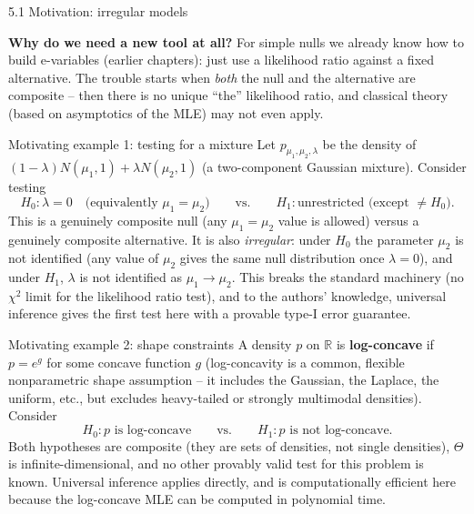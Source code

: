 \documentclass[aspectratio=169,10pt]{beamer}
\newcommand{\R}{\mathbb{R}}
\begin{document}
\begin{frame}[allowframebreaks]{5.1 Motivation: irregular models}

  \textbf{Why do we need a new tool at all?} For simple nulls we
  already know how to build e-variables (earlier chapters): just use a
  likelihood ratio against a fixed alternative. The trouble starts when
  \emph{both} the null and the alternative are composite -- then there
  is no unique ``the'' likelihood ratio, and classical theory (based on
  asymptotics of the MLE) may not even apply.

  \begin{exampleblock}{Motivating example 1: testing for a mixture}
    Let $p_{\mu_1,\mu_2,\lambda}$ be the density of
    $(1-\lambda)N(\mu_1,1) + \lambda N(\mu_2,1)$ (a two-component
    Gaussian mixture). Consider testing
    $$ H_0: \lambda = 0 \quad\text{(equivalently } \mu_1 = \mu_2 \text{)}
       \qquad\text{vs.}\qquad H_1: \text{unrestricted (except } \neq H_0). $$
    This is a genuinely composite null (any $\mu_1=\mu_2$ value is
    allowed) versus a genuinely composite alternative. It is also
    \emph{irregular}: under $H_0$ the parameter $\mu_2$ is not
    identified (any value of $\mu_2$ gives the same null distribution
    once $\lambda=0$), and under $H_1$, $\lambda$ is not identified as
    $\mu_1\to\mu_2$. This breaks the standard machinery (no
    $\chi^2$ limit for the likelihood ratio test), and to the authors'
    knowledge, universal inference gives the first test here with a
    provable type-I error guarantee.
  \end{exampleblock}

  \framebreak

  \begin{exampleblock}{Motivating example 2: shape constraints}
    A density $p$ on $\R$ is \textbf{log-concave} if $p = e^g$ for some
    concave function $g$ (log-concavity is a common, flexible
    nonparametric shape assumption -- it includes the Gaussian, the
    Laplace, the uniform, etc., but excludes heavy-tailed or strongly
    multimodal densities). Consider
    $$ H_0: p \text{ is log-concave} \qquad\text{vs.}\qquad H_1: p \text{ is not log-concave}. $$
    Both hypotheses are composite (they are sets of densities, not
    single densities), $\Theta$ is infinite-dimensional, and no other
    provably valid test for this problem is known. Universal inference
    applies directly, and is computationally efficient here because the
    log-concave MLE can be computed in polynomial time.
  \end{exampleblock}


\end{frame}
\end{document}
